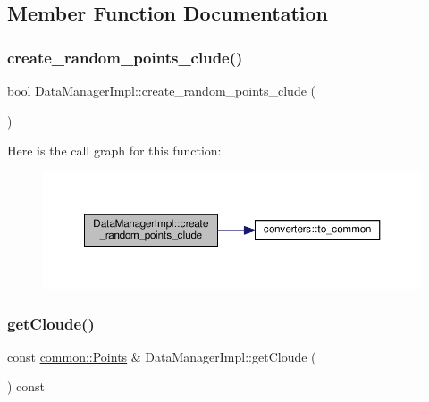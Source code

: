 \subsection{Member Function Documentation}
\mbox{\label{classDataManagerImpl_a726a882efc72b98c0357be1ae3f21a57}} 
\subsubsection{\texorpdfstring{create\+\_\+random\+\_\+points\+\_\+clude()}{create\_random\_points\_clude()}}
{\footnotesize\ttfamily bool Data\+Manager\+Impl\+::create\+\_\+random\+\_\+points\+\_\+clude (\begin{DoxyParamCaption}{ }\end{DoxyParamCaption})}

Here is the call graph for this function\+:
\nopagebreak
\begin{figure}[H]
\begin{center}
\leavevmode
\includegraphics[width=350pt]{classDataManagerImpl_a726a882efc72b98c0357be1ae3f21a57_cgraph}
\end{center}
\end{figure}
\mbox{\label{classDataManagerImpl_aec9fee3f8963693cbe6c6c6a6c2ddcff}} 
\subsubsection{\texorpdfstring{get\+Cloude()}{getCloude()}}
{\footnotesize\ttfamily const \mbox{\hyperlink{namespacecommon_a1aefa0cce5e127612ab7ca981276ab7e}{common\+::\+Points}} \& Data\+Manager\+Impl\+::get\+Cloude (\begin{DoxyParamCaption}{ }\end{DoxyParamCaption}) const}



